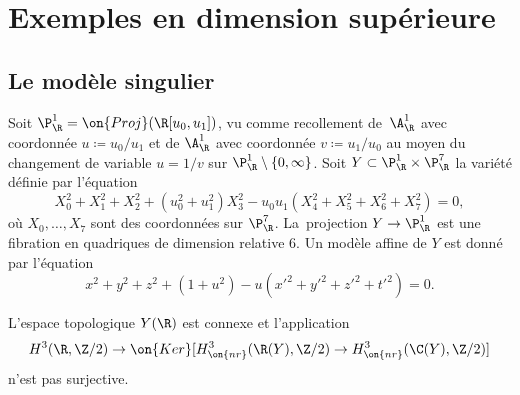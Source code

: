 \section{Exemples en dimension supérieure}\label{dimsup}

\subsection{Le modèle singulier} Soit $\P^1_\R=\on{Proj}(\R[u_0,u_1])$, vu comme recollement de~$\A^1_\R$ avec coordonnée $u\coloneqq u_0/u_1$ et de $\A^1_\R$ avec coordonnée $v\coloneqq u_1/u_0$ au moyen du changement de variable $u=1/v$ sur $\P^1_\R\setminus\{0,\infty\}$. Soit $Y\subset \P^1_\R\times \P^7_\R$ la variété définie par l'équation
\[X_0^2+X_1^2+X_2^2 + (u_0^2+u_1^2)X_3^2 - u_0u_1(X_4^2+X_5^2+X_6^2+X_7^2) =0,\]
où $X_0,\dots,X_7$ sont des coordonnées sur $\P^7_\R$. La~projection $Y\to \P^1_\R$ est une fibration en quadriques de dimension relative $6$. Un modèle affine de $Y$ est donné par l'équation
\begin{equation} \label{eq:affine}
x^2+y^2+z^2 + (1+u^2) - u(x'^2+y'^2+z'^2+t'^2) = 0.
\end{equation}

\begin{lemma}\label{deuxieme-modele}
L'espace topologique $Y(\R)$ est connexe et l'application
\[H^3(\R,\Z/2)\to \on{Ker}[H^3_{\on{nr}}(\R(Y),\Z/2)\to H^3_{\on{nr}}(\C(Y),\Z/2)]\] n'est pas surjective.
\end{lemma}

